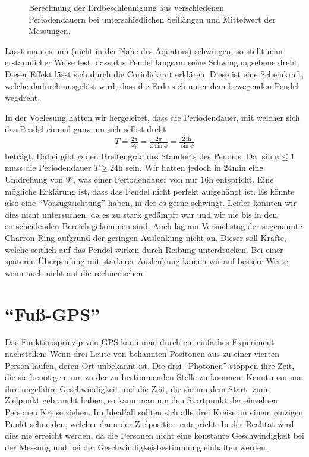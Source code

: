\documentclass[12pt,a4paper,titlepage,headinclude,bibtotoc]{scrartcl}
\begin{document}
\begin{figure}[!htb]
	\centering
	
	\caption{Berechnung der Erdbeschleunigung aus verschiedenen Periodendauern bei unterschiedlichen Seillängen und Mittelwert der Messungen.}
	\label{fig:gbesch}
\end{figure}

Lässt man es nun (nicht in der Nähe des Äquators) schwingen, so stellt man erstaunlicher Weise fest, dass das Pendel langsam seine Schwingungsebene dreht.
Dieser Effekt lässt sich durch die Corioliskraft erklären.
Diese ist eine Scheinkraft, welche dadurch ausgelöst wird, dass die Erde sich unter dem bewegenden Pendel wegdreht.

In der Voelesung hatten wir hergeleitet, dass die Periodendauer, mit welcher sich das Pendel einmal ganz um sich selbst dreht
\begin{align}
	T=\frac{2\pi}{\omega_r}=\frac{2\pi}{\omega\sin\phi}=\frac{24\si\hour}{\sin\phi}
\end{align}
beträgt.
Dabei gibt $\phi$ den Breitengrad des Standorts des Pendels.
Da $\sin\phi\leq1$ muss die Periodendauer $T\geq24\si\hour$ sein.
Wir hatten jedoch in $24\si\minute$ eine Umdrehung von $9\si\degree$, was einer Periodendauer von nur $16\si\hour$ entspricht.
Eine mögliche Erklärung ist, dass das Pendel nicht perfekt aufgehängt ist.
Es könnte also eine "`Vorzugsrichtung"' haben, in der es gerne schwingt.
Leider konnten wir dies nicht untersuchen, da es zu stark gedämpft war und wir nie bis in den entscheidenden Bereich gekommen sind.
Auch lag am Versuchstag der sogenannte Charron-Ring aufgrund der geringen Auslenkung nicht an.
Dieser soll Kräfte, welche seitlich auf das Pendel wirken durch Reibung unterdrücken.
Bei einer späteren Überprüfung mit stärkerer Auslenkung kamen wir auf bessere Werte, wenn auch nicht auf die rechnerischen.




\section{"`Fuß-GPS"'}
Das Funktionsprinzip von GPS kann man durch ein einfaches Experiment nachstellen:
Wenn drei Leute von bekannten Positonen aus zu einer vierten Person laufen, deren Ort unbekannt ist.
Die drei "`Photonen"' stoppen ihre Zeit, die sie benötigen, um zu der zu bestimmenden Stelle zu kommen.
Kennt man nun ihre ungefähre Geschwindigkeit und die Zeit, die sie um dem Start- zum Zielpunkt gebraucht haben, so kann man um den Startpunkt der einzelnen Personen Kreise ziehen.
Im Idealfall sollten sich alle drei Kreise an einem einzigen Punkt schneiden, welcher dann der Zielposition entspricht.
In der Realität wird dies nie erreicht werden, da die Personen nicht eine konstante Geschwindigkeit bei der Messung und bei der Geschwindigkeisbestimmung einhalten werden.
\end{document}
